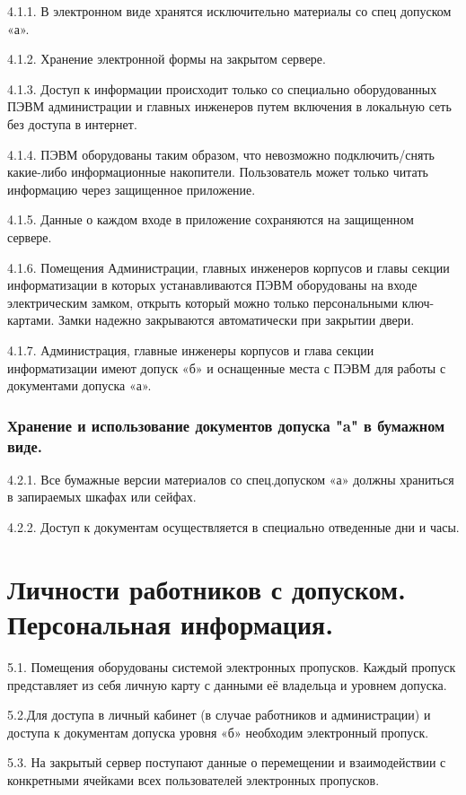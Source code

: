 \documentclass[utf8,14pt,a4paper,oneside,russian]{book}
\begin{document}
4.1.1. В электронном виде хранятся исключительно материалы со спец
допуском «а».

4.1.2. Хранение электронной формы на закрытом сервере.

4.1.3. Доступ к информации происходит только со специально
оборудованных ПЭВМ администрации и главных инженеров путем включения
в локальную сеть без доступа в интернет.

4.1.4. ПЭВМ оборудованы таким образом, что невозможно подключить/снять
какие-либо информационные накопители. Пользователь может только
читать информацию через защищенное приложение.

4.1.5. Данные о каждом входе в приложение сохраняются на защищенном сервере.

4.1.6. Помещения Администрации, главных инженеров корпусов и
главы секции информатизации в которых устанавливаются ПЭВМ оборудованы
на входе электрическим замком, открыть который можно только персональными
ключ-картами. Замки надежно закрываются автоматически при закрытии двери.

4.1.7. Администрация, главные инженеры корпусов и глава секции
информатизации имеют допуск «б» и оснащенные места с ПЭВМ для работы
с документами допуска «а».


\subsubsection{Хранение и использование документов допуска "a" в бумажном виде.}

4.2.1. Все бумажные версии материалов со спец.допуском «а» должны
храниться в запираемых шкафах или сейфах.

4.2.2. Доступ к документам осуществляется в специально отведенные
дни и часы.


\section{Личности работников с допуском. Персональная информация.}

5.1. Помещения оборудованы системой электронных пропусков. Каждый
пропуск представляет из себя личную карту с данными её владельца и
уровнем допуска.

5.2.Для доступа в личный кабинет (в случае работников и администрации)
и доступа к документам допуска уровня «б» необходим электронный пропуск.

5.3. На закрытый сервер поступают данные о перемещении и взаимодействии
с конкретными ячейками всех пользователей электронных пропусков.
\end{document}
